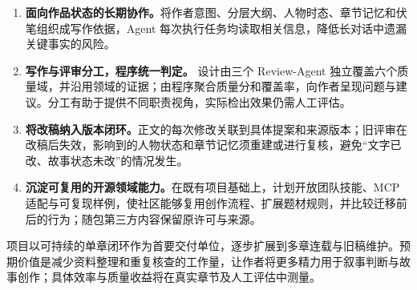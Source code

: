 \begin{enumerate}
  \item \textbf{面向作品状态的长期协作。}将作者意图、分层大纲、人物时态、章节记忆和伏笔组织成写作依据，Agent 每次执行任务均读取相关信息，降低长对话中遗漏关键事实的风险。
  \item \textbf{写作与评审分工，程序统一判定。} 设计由三个 Review-Agent 独立覆盖六个质量域，并沿用领域的证据；由程序聚合质量分和覆盖率，向作者呈现问题与建议。分工有助于提供不同职责视角，实际检出效果仍需人工评估。
  \item \textbf{将改稿纳入版本闭环。}正文的每次修改关联到具体提案和来源版本；旧评审在改稿后失效，影响到的人物状态和章节记忆须重建或进行复核，避免“文字已改、故事状态未改”的情况发生。
  \item \textbf{沉淀可复用的开源领域能力。}在既有项目基础上，计划开放团队技能、MCP 适配与可复现样例，使社区能够复用创作流程、扩展题材规则，并比较迁移前后的行为；随包第三方内容保留原许可与来源。
\end{enumerate}

项目以可持续的单章闭环作为首要交付单位，逐步扩展到多章连载与旧稿维护。预期价值是减少资料整理和重复核查的工作量，让作者将更多精力用于叙事判断与故事创作；具体效率与质量收益将在真实章节及人工评估中测量。
